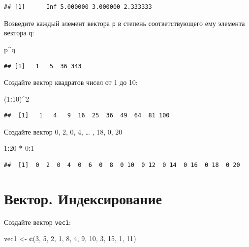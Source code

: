 \documentclass[]{book}
\newenvironment{Shaded}{\begin{snugshade}}{\end{snugshade}}
\newcommand{\DecValTok}[1]{\textcolor[rgb]{0.00,0.00,0.81}{#1}}
\newcommand{\KeywordTok}[1]{\textcolor[rgb]{0.13,0.29,0.53}{\textbf{#1}}}
\newcommand{\NormalTok}[1]{#1}
\newcommand{\OperatorTok}[1]{\textcolor[rgb]{0.81,0.36,0.00}{\textbf{#1}}}
\newcommand{\StringTok}[1]{\textcolor[rgb]{0.31,0.60,0.02}{#1}}
\begin{document}
\begin{verbatim}
## [1]      Inf 5.000000 3.000000 2.333333
\end{verbatim}

Возведите каждый элемент вектора \texttt{p} в степень соответствующего ему элемента вектора \texttt{q}:

\begin{Shaded}
\begin{Highlighting}[]
\NormalTok{p}\OperatorTok{^}\NormalTok{q}
\end{Highlighting}
\end{Shaded}

\begin{verbatim}
## [1]   1   5  36 343
\end{verbatim}

Создайте вектор квадратов чисел от 1 до 10:

\begin{Shaded}
\begin{Highlighting}[]
\NormalTok{(}\DecValTok{1}\OperatorTok{:}\DecValTok{10}\NormalTok{)}\OperatorTok{^}\DecValTok{2}
\end{Highlighting}
\end{Shaded}

\begin{verbatim}
##  [1]   1   4   9  16  25  36  49  64  81 100
\end{verbatim}

Создайте вектор 0, 2, 0, 4, \ldots{} , 18, 0, 20

\begin{Shaded}
\begin{Highlighting}[]
\DecValTok{1}\OperatorTok{:}\DecValTok{20} \OperatorTok{*}\StringTok{ }\DecValTok{0}\OperatorTok{:}\DecValTok{1}
\end{Highlighting}
\end{Shaded}

\begin{verbatim}
##  [1]  0  2  0  4  0  6  0  8  0 10  0 12  0 14  0 16  0 18  0 20
\end{verbatim}

\hypertarget{solvvec_task_2}{%
\section{Вектор. Индексирование}\label{solvvec_task_2}}

Создайте вектор \texttt{vec1}:

\begin{Shaded}
\begin{Highlighting}[]
\NormalTok{vec1 <-}\StringTok{ }\KeywordTok{c}\NormalTok{(}\DecValTok{3}\NormalTok{, }\DecValTok{5}\NormalTok{, }\DecValTok{2}\NormalTok{, }\DecValTok{1}\NormalTok{, }\DecValTok{8}\NormalTok{, }\DecValTok{4}\NormalTok{, }\DecValTok{9}\NormalTok{, }\DecValTok{10}\NormalTok{, }\DecValTok{3}\NormalTok{, }\DecValTok{15}\NormalTok{, }\DecValTok{1}\NormalTok{, }\DecValTok{11}\NormalTok{)}
\end{Highlighting}
\end{Shaded}
\end{document}
